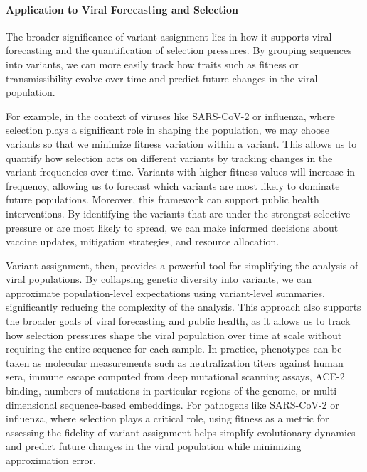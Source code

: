 \paragraph{Application to Viral Forecasting and Selection}

The broader significance of variant assignment lies in how it supports viral forecasting and the quantification of selection pressures.
By grouping sequences into variants, we can more easily track how traits such as fitness or transmissibility evolve over time and predict future changes in the viral population.

For example, in the context of viruses like SARS-CoV-2 or influenza, where selection plays a significant role in shaping the population, we may choose variants so that we minimize fitness variation within a variant.
This allows us to quantify how selection acts on different variants by tracking changes in the variant frequencies over time.
Variants with higher fitness values will increase in frequency, allowing us to forecast which variants are most likely to dominate future populations.
Moreover, this framework can support public health interventions.
By identifying the variants that are under the strongest selective pressure or are most likely to spread, we can make informed decisions about vaccine updates, mitigation strategies, and resource allocation.

Variant assignment, then, provides a powerful tool for simplifying the analysis of viral populations.
By collapsing genetic diversity into variants, we can approximate population-level expectations using variant-level summaries, significantly reducing the complexity of the analysis.
This approach also supports the broader goals of viral forecasting and public health, as it allows us to track how selection pressures shape the viral population over time at scale without requiring the entire sequence for each sample.
In practice, phenotypes can be taken as molecular measurements such as neutralization titers against human sera, immune escape computed from deep mutational scanning assays, ACE-2 binding, numbers of mutations in particular regions of the genome, or multi-dimensional sequence-based embeddings. \cite{Jian2023, Dadonaite2023, greaney2022antibody, Nanduri2024}
For pathogens like SARS-CoV-2 or influenza, where selection plays a critical role, using fitness as a metric for assessing the fidelity of variant assignment helps simplify evolutionary dynamics and predict future changes in the viral population while minimizing approximation error.

